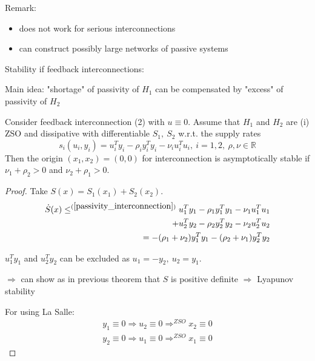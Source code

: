 Remark:
\begin{itemize}
\item does not work for serious interconnections
\item can construct possibly large networks of passive systems
\end{itemize}

Stability if feedback interconnections:

Main idea: "shortage" of passivity of $H_1$ can be compensated by "excess" of passivity of $H_2$

\begin{Theorem}
Consider feedback interconnection (2) with $u \equiv 0$. Assume that $H_1$ and $H_2$ are (i) ZSO and dissipative with differentiable $S_1, \ S_2$ w.r.t. the supply rates
\begin{equation}\label{passivity_interconnection}
s_i(u_i,y_i) = u_i^Ty_i - \rho_iy_i^Ty_i - \nu_iu_i^Tu_i, \ i=1,2, \ \rho,\nu \in \mathbb{R}
\end{equation}
Then the origin $(x_1,x_2) = (0,0)$ for interconnection is asymptotically stable if $\nu_1 + \rho_2 > 0$ and $\nu_2 + \rho_1 > 0$.
\begin{proof}
Take $S(x) = S_1(x_1)+S_2(x_2)$.
\begin{equation*}
\begin{split}
\dot{S}(x) \leq^{(\ref{passivity_interconnection})} u_1^Ty_1 - \rho_1 y_1^Ty_1 - \nu_1u_1^Tu_1 \\
+ u_2^Ty_2 - \rho_2y_2^Ty_2 - \nu_2u_2^Tu_2 \\
= - (\rho_1 + \nu_2)y_1^Ty_1 - (\rho_2 +\nu_1)y_2^Ty_2
\end{split}
\end{equation*}

$u_1^Ty_1$ and $u_2^Ty_2$ can be excluded as $u_1=-y_2, \ u_2 = y_1$. 

$\Rightarrow$ can show as in previous theorem that $S$ is positive definite $\Rightarrow$ Lyapunov stability

For using La Salle:
\begin{equation*}
\begin{split}
y_1 \equiv 0 \Rightarrow u_2 \equiv 0 \Rightarrow^{ZSO} x_2 \equiv 0 \\
y_2 \equiv 0 \Rightarrow u_1 \equiv 0 \Rightarrow^{ZSO} x_1 \equiv 0
\end{split}
\end{equation*}
\end{proof}
\end{Theorem}

